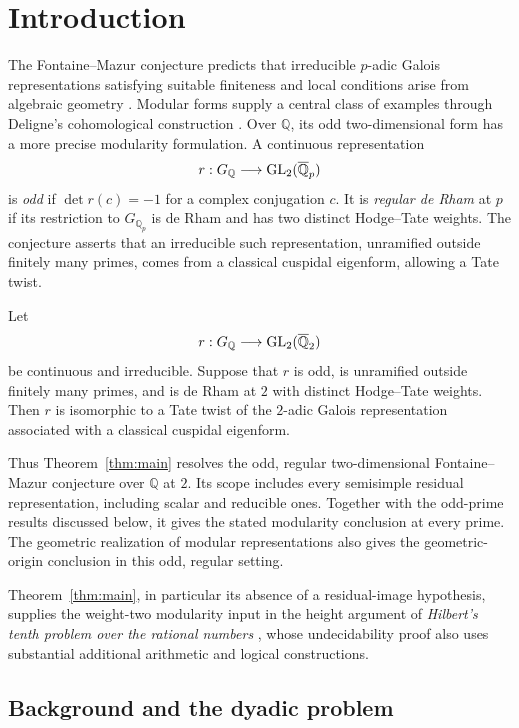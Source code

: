 \section{Introduction}\label{sec:introduction}

The Fontaine--Mazur conjecture predicts that irreducible \(p\)-adic
Galois representations satisfying suitable finiteness and local
conditions arise from algebraic geometry \cite{FM1995}. Modular forms supply
a central class of examples through Deligne's cohomological construction
\cite[Sections~3.9--3.12 and~5.2--5.5]{Deligne1971}. Over
\(\mathbb Q\), its odd two-dimensional form has a more precise
modularity formulation. A continuous representation
\[
 r:G_{\mathbb Q}\longrightarrow\operatorname{GL}_2(\overline{\mathbb Q}_p)
\]
is \emph{odd} if \(\det r(c)=-1\) for a complex conjugation \(c\).
It is \emph{regular de Rham} at \(p\) if its restriction to
\(G_{\mathbb Q_p}\) is de Rham and has two distinct Hodge--Tate
weights. The conjecture asserts that an irreducible such
representation, unramified outside finitely many primes, comes
from a classical cuspidal eigenform, allowing a Tate twist.

\begin{theorem}\label{thm:main}
Let
\[
 r:G_{\mathbb Q}\longrightarrow\operatorname{GL}_2(\overline{\mathbb Q}_2)
\]
be continuous and irreducible. Suppose that \(r\) is odd, is
unramified outside finitely many primes, and is de Rham at \(2\)
with distinct Hodge--Tate weights. Then \(r\) is isomorphic to
a Tate twist of the \(2\)-adic Galois representation associated
with a classical cuspidal eigenform.
\end{theorem}

Thus Theorem~\ref{thm:main} resolves the odd, regular two-dimensional
Fontaine--Mazur conjecture over \(\mathbb Q\) at \(2\). Its scope includes
every semisimple residual representation, including scalar and reducible
ones. Together with the odd-prime results discussed below, it gives the
stated modularity conclusion at every prime. The geometric realization
of modular representations also gives the geometric-origin conclusion
in this odd, regular setting.

Theorem~\ref{thm:main}, in particular its absence of a residual-image
hypothesis, supplies the weight-two modularity input in the height argument
of \emph{Hilbert's tenth problem over the rational numbers}
\cite[Section~4]{OpenAIH10Q2026}, whose undecidability proof also uses
substantial additional arithmetic and logical constructions.

\subsection{Background and the dyadic problem}

